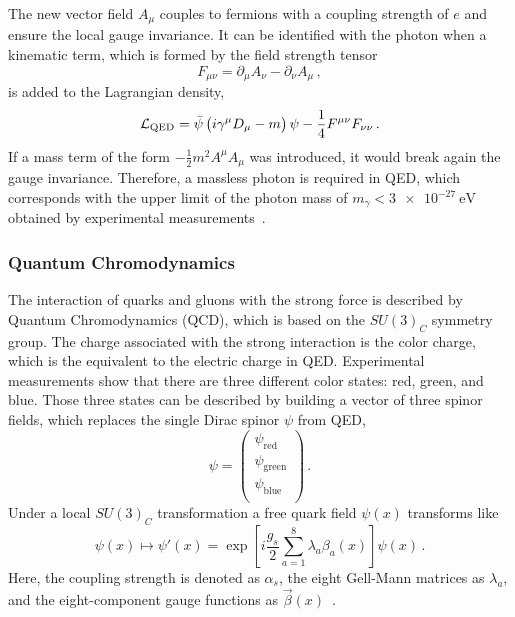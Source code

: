 The new vector field $A_\mu$ couples to fermions with a coupling strength of $e$ and ensure the local gauge invariance.
It can be identified with the photon when a kinematic term, which is formed by the field strength tensor
\begin{equation}
    F_{\mu \nu} = \partial_\mu A_\nu - \partial_\nu A_\mu \,,
\end{equation}
is added to the Lagrangian density,
\begin{equation}
    \mathcal{L}_\text{QED} = \bar{\psi} \left( i \gamma^\mu D_\mu -m \right) \psi - \frac{1}{4} F^{\mu\nu} F_{\nu\nu} \,.
\end{equation}
If a mass term of the form $-\frac{1}{2}m^2 A^\mu A_\mu $ was introduced, it would break again the gauge invariance.
Therefore, a massless photon is required in QED, which corresponds with the upper limit of the photon mass of $m_\gamma < \SI{3e-27}{\eV}$
obtained by experimental measurements~\cite{PhotonMass}.

\subsubsection{Quantum Chromodynamics}

The interaction of quarks and gluons with the strong force is described by Quantum Chromodynamics (QCD), which is based on the $SU(3)_C$ symmetry group.
The charge associated with the strong interaction is the color charge, which is the equivalent to the electric charge in QED\@.
Experimental measurements show that there are three different color states: red, green, and blue.
Those three states can be described by building a vector of three spinor fields, which replaces the single Dirac spinor $\psi$ from QED,
\begin{equation}
    \psi =
    \begin{pmatrix}
        \psi_\text{red} \\
        \psi_\text{green} \\
        \psi_\text{blue} \\
    \end{pmatrix} \,.
\end{equation}
Under a local $SU(3)_C$ transformation a free quark field $\psi(x)$ transforms like
\begin{equation}
    \psi(x) \mapsto \psi'(x) = \exp \left[ i \frac{g_s}{2} \sum_{a=1}^8 \lambda_a \beta_a (x) \right] \psi(x) \,.
\end{equation}
Here, the coupling strength is denoted as $\alpha_s$, the eight Gell-Mann matrices as $\lambda_a$, and the eight-component gauge functions as $\vec{\beta}(x)$~\cite{Schmuser}.

